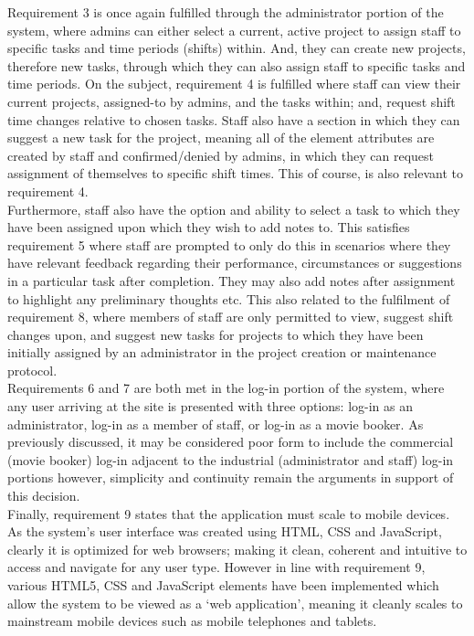 \documentclass[11pt, english]{article}
\begin{document}
	Requirement 3 is once again fulfilled through the administrator portion of the system, where admins can either select a current, active project to assign staff to specific tasks and time periods (shifts) within. And, they can create new projects, therefore new tasks, through which they can also assign staff to specific tasks and time periods. On the subject, requirement 4 is fulfilled where staff can view their current projects, assigned-to by admins, and the tasks within; and, request shift time changes relative to chosen tasks. Staff also have a section in which they can suggest a new task for the project, meaning all of the element attributes are created by staff and confirmed/denied by admins, in which they can request assignment of themselves to specific shift times. This of course, is also relevant to requirement 4.\\

	Furthermore, staff also have the option and ability to select a task to which they have been assigned upon which they wish to add notes to. This satisfies requirement 5 where staff are prompted to only do this in scenarios where they have relevant feedback regarding their performance, circumstances or suggestions in a particular task after completion. They may also add notes after assignment to highlight any preliminary thoughts etc. This also related to the fulfilment of requirement 8, where members of staff are only permitted to view, suggest shift changes upon, and suggest new tasks for projects to which they have been initially assigned by an administrator in the project creation or maintenance protocol.\\

	Requirements 6 and 7 are both met in the log-in portion of the system, where any user arriving at the site is presented with three options: log-in as an administrator, log-in as a member of staff, or log-in as a movie booker. As previously discussed, it may be considered poor form to include the commercial (movie booker) log-in adjacent to the industrial (administrator and staff) log-in portions however, simplicity and continuity remain the arguments in support of this decision.\\

	Finally, requirement 9 states that the application must scale to mobile devices. As the system's user interface was created using HTML, CSS and JavaScript, clearly it is optimized for web browsers; making it clean, coherent and intuitive to access and navigate for any user type. However in line with requirement 9, various HTML5, CSS and JavaScript elements have been implemented which allow the system to be viewed as a `web application', meaning it cleanly scales to mainstream mobile devices such as mobile telephones and tablets.\\
\end{document}
